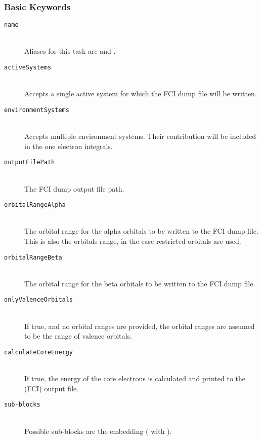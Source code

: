 \subsubsection{Basic Keywords}
\begin{description}
    \item [\texttt{name}]\hfill \\
    Aliases for this task are  and .
    \item [\texttt{activeSystems}]\hfill \\
    Accepts a single active system for which the FCI dump file will be written.
    \item [\texttt{environmentSystems}]\hfill \\
    Accepts multiple environment systems. Their contribution will be included in the one electron integrals.
    \item [\texttt{outputFilePath}]\hfill \\
    The FCI dump output file path.
    \item [\texttt{orbitalRangeAlpha}]\hfill \\
    The orbital range for the alpha orbitals to be written to the FCI dump file.
    This is also the orbitals range, in the case restricted orbitals are used.
    \item [\texttt{orbitalRangeBeta}]\hfill \\
    The orbital range for the beta orbitals to be written to the FCI dump file.
    \item [\texttt{onlyValenceOrbitals}]\hfill \\
    If true, and no orbital ranges are provided, the orbital ranges are assumed to be the range of valence orbitals.
    \item [\texttt{calculateCoreEnergy}]\hfill \\
    If true, the energy of the core electrons is calculated and printed to the (FCI) output file.
    \item[\texttt{sub-blocks}]\hfill \\
    Possible sub-blocks are the embedding ( with ).

\end{description}
